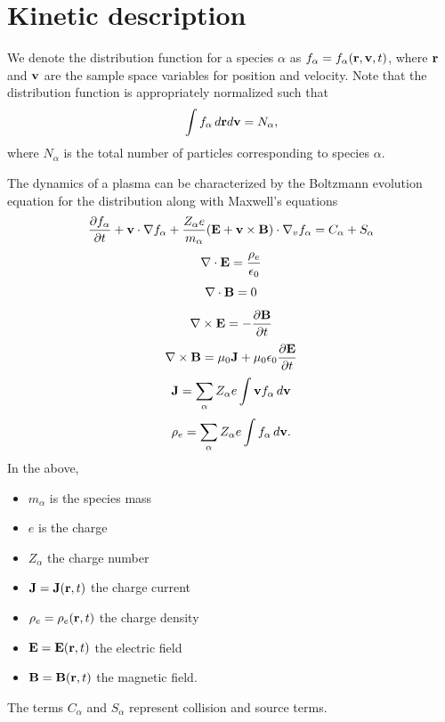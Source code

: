 \documentclass[a4paper,11pt]{report}
\begin{document}
\section{Kinetic description}
We denote the distribution function for a species $\alpha$ as $f_\alpha = f_\alpha(\mathbf{r}, \mathbf{v}, t)$, where $\mathbf{r}$ and $\mathbf{v}$ are the sample space variables for position and velocity. Note that the distribution function is appropriately normalized such that
\begin{equation}
\int f_\alpha \, d\mathbf{r} d\mathbf{v} = N_\alpha,
\end{equation}
where $N_\alpha$ is the total number of particles corresponding to species $\alpha$. 

The dynamics of a plasma can be characterized by the Boltzmann evolution equation for the distribution along with Maxwell's equations
\begin{equation}
\label{eq:kinetic_equation}
\frac{\partial f_\alpha}{\partial t} + \mathbf{v} \cdot \nabla f_\alpha + \frac{Z_\alpha e}{m_\alpha} ( \mathbf{E} + \mathbf{v} \times \mathbf{B} ) \cdot \nabla_v f_\alpha = C_\alpha + S_\alpha
\end{equation}
\begin{equation}
\label{eq:maxwell_3}
\nabla \cdot \mathbf{E} = \frac{\rho_e}{\epsilon_0} 
\end{equation}
\begin{equation}
\label{eq:maxwell_4}
\nabla \cdot \mathbf{B} = 0
\end{equation}
\begin{equation}
\label{eq:maxwell_1}
\nabla \times \mathbf{E} = -\frac{ \partial \mathbf{B}}{\partial t}
\end{equation}
\begin{equation}
\label{eq:maxwell_2}
\nabla \times \mathbf{B} = \mu_0 \mathbf{J} + \mu_0 \epsilon_0 \frac{\partial \mathbf{E}}{\partial t}
\end{equation}
\begin{equation}
\mathbf{J} = \sum_\alpha Z_\alpha e \int \mathbf{v} f_\alpha \, d\mathbf{v}
\end{equation}
\begin{equation}
\rho_e = \sum_\alpha Z_\alpha e \int f_\alpha \, d\mathbf{v}.
\end{equation}
In the above, 
\begin{itemize}
\item $m_\alpha$ is the species mass
\item $e$ is the charge
\item $Z_\alpha$ the charge number
\item $\mathbf{J} = \mathbf{J}(\mathbf{r},t)$ the charge current
\item $\rho_e = \rho_e(\mathbf{r},t)$ the charge density
\item $\mathbf{E} = \mathbf{E}(\mathbf{r},t)$ the electric field
\item $\mathbf{B} = \mathbf{B}(\mathbf{r},t)$ the magnetic field.
\end{itemize}
The terms $C_\alpha$ and $S_\alpha$ represent collision and source terms.
\end{document}
